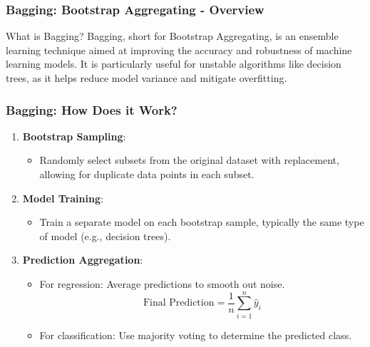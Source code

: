 \documentclass[aspectratio=169]{beamer}
\begin{document}
\begin{frame}[fragile]
    \frametitle{Bagging: Bootstrap Aggregating - Overview}
    \begin{block}{What is Bagging?}
        Bagging, short for Bootstrap Aggregating, is an ensemble learning technique aimed at improving the accuracy and robustness of machine learning models. It is particularly useful for unstable algorithms like decision trees, as it helps reduce model variance and mitigate overfitting.
    \end{block}
\end{frame}

\begin{frame}[fragile]
    \frametitle{Bagging: How Does it Work?}
    \begin{enumerate}
        \item \textbf{Bootstrap Sampling}:
        \begin{itemize}
            \item Randomly select subsets from the original dataset with replacement, allowing for duplicate data points in each subset.
        \end{itemize}
        
        \item \textbf{Model Training}:
        \begin{itemize}
            \item Train a separate model on each bootstrap sample, typically the same type of model (e.g., decision trees).
        \end{itemize}
        
        \item \textbf{Prediction Aggregation}:
        \begin{itemize}
            \item For regression: Average predictions to smooth out noise.
            \[
            \text{Final Prediction} = \frac{1}{n} \sum_{i=1}^{n} \hat{y}_i
            \]
            \item For classification: Use majority voting to determine the predicted class.
        \end{itemize}
    \end{enumerate}
\end{frame}
\end{document}
